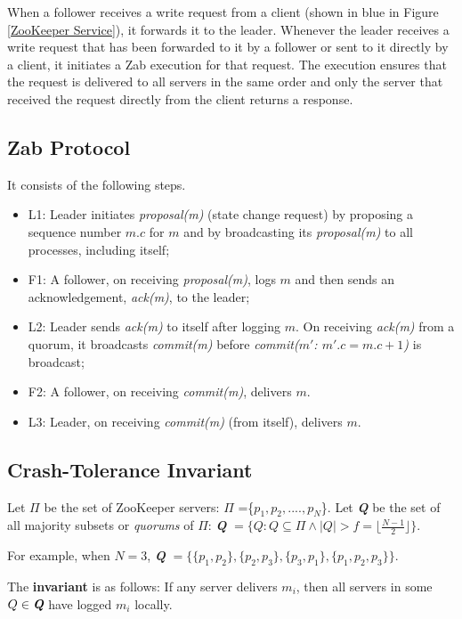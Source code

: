 \documentclass[a4paper,UKenglish]{oasics-v2016}
\begin{document}
When a follower receives a write request from a client (shown in blue in Figure \ref{ZooKeeper Service}), it forwards it to the leader. Whenever the leader receives a write request that has been forwarded to it by a follower or sent to it directly by a client, it initiates a Zab execution for that request. The execution ensures that the request is delivered to all servers in the same order and only the server that received the request directly from the client returns a response.


\subsection{Zab Protocol}


It consists of the following steps.
\begin{itemize}
	\item L1: Leader initiates \emph{proposal(m)} (state change request) by proposing a sequence number $m.c$ for $m$ and by broadcasting its \emph{proposal(m)} to all processes, including itself;
	\item F1: A follower, on receiving \emph{proposal(m)}, logs $m$
	and then sends an acknowledgement, \emph{ack(m)}, to the leader;
	\item L2: Leader sends \emph{ack(m)} to itself after logging $m$. On receiving \emph{ack(m)}
	from a quorum, it broadcasts \emph{commit(m)} before \emph{commit($m'$: $m'.c = m.c+1$)} is broadcast;
	\item F2: A follower, on receiving \emph{commit(m)}, delivers $m$.
	\item L3: Leader, on receiving \emph{commit(m)} (from itself),  delivers $m$.
\end{itemize}

\subsection{Crash-Tolerance Invariant} \label{Crash-Tolerance Invariant}


Let $\Pi$ be the set of ZooKeeper servers: $\Pi$ =\{$p_{1},p_{2},....,p_{N}$\}. Let \emph{\textbf{Q}} be the set of all majority subsets or \emph{quorums} of $\Pi$: \emph{\textbf{Q}} $ = \{Q : Q\subseteq \Pi \wedge |Q| > f = \lfloor\frac{N-1}{2}\rfloor  \}$.

For example, when $N=3$, \emph{\textbf{Q}} $ = \{ \{p_{1},p_{2}\}, \{p_{2},p_{3}\},\{p_{3},p_{1}\}, \{p_{1},p_{2},p_{3}\}  \} $.

\noindent The \textbf{invariant} is as follows: If any server delivers $m_i$, then all servers in some $Q \in \emph{\textbf{Q}}$ have logged $m_i$ locally.
\end{document}
